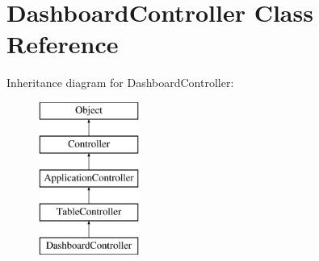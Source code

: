 \hypertarget{class_dashboard_controller}{
\section{DashboardController Class Reference}
\label{class_dashboard_controller}
}
Inheritance diagram for DashboardController:\begin{figure}[H]
\begin{center}
\leavevmode
\includegraphics[height=5.000000cm]{class_dashboard_controller}
\end{center}
\end{figure}
